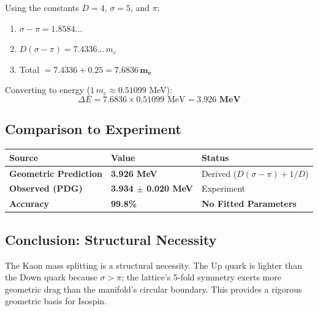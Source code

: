 Using the constants $D=4$, $\sigma=5$, and $\pi$:
\begin{enumerate}
    \item $\sigma - \pi = 1.8584\dots$
    \item $D(\sigma - \pi) = 7.4336\dots \, m_e$
    \item Total $= 7.4336 + 0.25 = \mathbf{7.6836 \, m_e}$
\end{enumerate}

Converting to energy ($1 \, m_e \approx 0.51099$ MeV):
\begin{equation}
    \Delta E = 7.6836 \times 0.51099 \text{ MeV} = \mathbf{3.926 \text{ MeV}}
\end{equation}

\subsection*{Comparison to Experiment}
\begin{table}[h]
\centering
\begin{tabular}{lll}
\toprule
\textbf{Source} & \textbf{Value} & \textbf{Status} \\ \midrule
\textbf{Geometric Prediction} & \textbf{3.926 MeV} & Derived ($D(\sigma-\pi)+1/D$) \\
\textbf{Observed (PDG)} & \textbf{3.934 $\pm$ 0.020 MeV} & Experiment \\
\textbf{Accuracy} & \textbf{99.8\%} & \textbf{No Fitted Parameters} \\ \bottomrule
\end{tabular}
\end{table}

\subsection*{Conclusion: Structural Necessity}
The Kaon mass splitting is a structural necessity. The Up quark is lighter than the Down quark because $\sigma > \pi$; the lattice's 5-fold symmetry exerts more geometric drag than the manifold's circular boundary. This provides a rigorous geometric basis for Isospin.